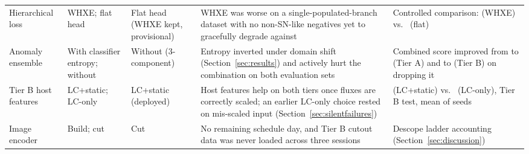 \begin{table}[htb]
\begin{tabular}{L{2.1cm}L{2.6cm}L{2.5cm}L{3.5cm}L{3.0cm}}
Hierarchical loss & WHXE; flat head & Flat head (WHXE kept, provisional) &
  WHXE was worse on a single-populated-branch dataset with no non-SN-like
  negatives yet to gracefully degrade against & Controlled comparison:
  \TierWHXEMacroFFull{} (WHXE) vs.\ \TierLCOnlyMacroFFull{} (flat) \\
Anomaly ensemble & With classifier entropy; without & Without (3-component) &
  Entropy inverted under domain shift (Section~\ref{sec:results}) and
  actively hurt the combination on both evaluation sets & Combined score
  improved from \AnomalyTierACombined{} to
  \AnomalyTierACombinedThreeRecomputed{} (Tier A) and \AnomalyTierBCombined{}
  to \AnomalyTierBCombinedThreeRecomputed{} (Tier B) on dropping it \\
Tier B host features & LC+static; LC-only & LC+static (deployed) & Host
  features help on both tiers once fluxes are correctly scaled; an earlier
  LC-only choice rested on mis-scaled input (Section~\ref{sec:silentfailures})
  & \WithStaticMacroF{} (LC+static) vs.\ \LCOnlyMacroF{} (LC-only), Tier B
  test, mean of \TierBNSeeds{} seeds \\
Image encoder & Build; cut & Cut & No remaining schedule day, and Tier B
  cutout data was never loaded across three sessions & Descope ladder
  accounting (Section~\ref{sec:discussion}) \\
\bottomrule
\end{tabular}
\end{table}
